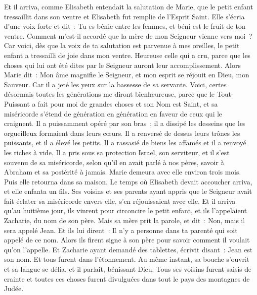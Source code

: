 \begin{multicols}{2}
Et il arriva, comme Elisabeth entendait la salutation de Marie, que le petit enfant tressaillit dans son ventre et Elisabeth fut remplie de l'Esprit Saint.
Elle s'écria d'une voix forte et dit~: Tu es bénie entre les femmes, et béni est le fruit de ton ventre.
Comment m'est-il accordé que la mère de mon Seigneur vienne vers moi~?
Car voici, dès que la voix de ta salutation est parvenue à mes oreilles, le petit enfant a tressailli de joie dans mon ventre.
Heureuse celle qui a cru, parce que les choses qui lui ont été dites par le Seigneur auront leur accomplissement.
Alors Marie dit~: Mon âme magnifie le Seigneur,
et mon esprit se réjouit en Dieu, mon Sauveur.
Car il a jeté les yeux sur la bassesse de sa servante. Voici, certes désormais toutes les générations me diront bienheureuse,
parce que le Tout-Puissant a fait pour moi de grandes choses et son Nom est Saint,
et sa miséricorde s'étend de génération en génération en faveur de ceux qui le craignent.
Il a puissamment opéré par son bras~; il a dissipé les desseins que les orgueilleux formaient dans leurs cœurs.
Il a renversé de dessus leurs trônes les puissants, et il a élevé les petits.
Il a rassasié de biens les affamés et il a renvoyé les riches à vide.
Il a pris sous sa protection Israël, son serviteur, et il s'est souvenu de sa miséricorde,
selon qu'il en avait parlé à nos pères, savoir à Abraham et sa postérité à jamais.
Marie demeura avec elle environ trois mois. Puis elle retourna dans sa maison.
Le temps où Elisabeth devait accoucher arriva, et elle enfanta un fils.
Ses voisins et ses parents ayant appris que le Seigneur avait fait éclater sa miséricorde envers elle, s'en réjouissaient avec elle.
Et il arriva qu'au huitième jour, ils vinrent pour circoncire le petit enfant, et ils l'appelaient Zacharie, du nom de son père.
Mais sa mère prit la parole, et dit~: Non, mais il sera appelé Jean.
Et ils lui dirent~: Il n'y a personne dans ta parenté qui soit appelé de ce nom.
Alors ils firent signe à son père pour savoir comment il voulait qu'on l'appelle.
Et Zacharie ayant demandé des tablettes, écrivit disant~: Jean est son nom. Et tous furent dans l'étonnement.
Au même instant, sa bouche s'ouvrit et sa langue se délia, et il parlait, bénissant Dieu.
Tous ses voisins furent saisis de crainte et toutes ces choses furent divulguées dans tout le pays des montagnes de Judée.

\end{multicols}
